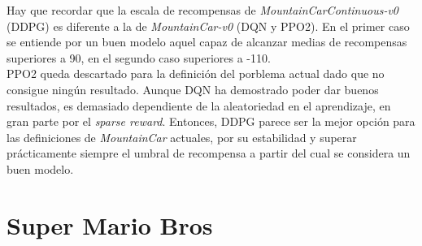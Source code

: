 \documentclass[11pt,fleqn]{book} %
\begin{document}
Hay que recordar que la escala de recompensas de \textit{MountainCarContinuous-v0} (DDPG) es diferente a la de \textit{MountainCar-v0} (DQN y PPO2). En el primer caso se entiende por un buen modelo aquel capaz de alcanzar medias de recompensas superiores a 90, en el segundo caso superiores a -110. \\

PPO2 queda descartado para la definición del porblema actual dado que no consigue ningún resultado. Aunque DQN ha demostrado poder dar buenos resultados, es demasiado dependiente de la aleatoriedad en el aprendizaje, en gran parte por el \textit{sparse reward}. Entonces, DDPG parece ser la mejor opción para las definiciones de \textit{MountainCar} actuales, por su estabilidad y superar prácticamente siempre el umbral de recompensa a partir del cual se considera un buen modelo.

\section{Super Mario Bros}
\end{document}

